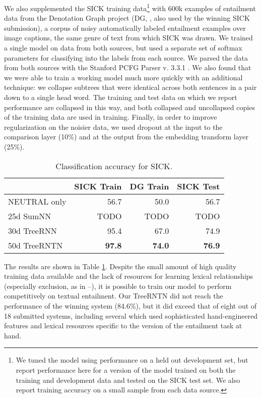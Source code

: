 We also supplemented the SICK training data\footnote{We tuned the model using performance on a held out development set, but report performance here for a version of the model trained on both the training and development data and tested on the SICK test set. We also report training accuracy on a small sample from each data source.} with 600k examples of entailment data from the Denotation Graph project (DG, \citealt{hodoshimage}, also used by the winning SICK submission), a corpus of noisy automatically labeled entailment examples over image captions, the same genre of text from which SICK was drawn. We trained a single model on data from both sources, but used a separate set of softmax parameters for classifying into the labels from each source. We parsed the data from both sources with the Stanford PCFG Parser v. 3.3.1 \cite{klein2003accurate}. We also found that we were able to train a working model much more quickly with an additional technique: we collapse subtrees that were identical across both sentences in a pair down to a single head word. The training and test data on which we report performance are collapsed in this way, and both collapsed and uncollapsed copies of the training data are used in training. Finally, in order to improve regularization on the noisier data, we used dropout \cite{srivastava2014dropout} at the input to the comparison layer (10\%) and at the output from the embedding transform layer (25\%). 

\begin{table}[tp]
  \centering \small
  \begin{tabular}{ l r@{ \ } r@{ \ } r@{ \ } }
    \toprule
    ~&\multicolumn{1}{c}{SICK Train} & \multicolumn{1}{c}{DG Train}  & \multicolumn{1}{c}{SICK Test}\\
    \midrule
    NEUTRAL only &	56.7	&	50.0	  &	56.7\\
    25d SumNN	&	TODO	&	TODO &	TODO	\\
    30d TreeRNN	&	95.4		&	67.0	&	74.9		\\
    50d TreeRNTN	&\textbf{97.8}	& \textbf{74.0}&\textbf{76.9}\\
    \bottomrule
  \end{tabular}
  \caption{Classification accuracy for SICK.}
  \label{sresultstable}
\end{table} 

The results are shown in Table \ref{sresultstable}. Despite the small amount of high quality training data available and the lack of resources for learning lexical relationships (especially exclusion, as in --), it is possible to train our model to perform competitively on textual entailment. Our TreeRNTN did not reach the performance of the winning system (84.6\%), but it did exceed that of eight out of 18 submitted systems, including several which used sophisticated hand-engineered features and lexical resources specific to the version of the entailment task at hand. 


